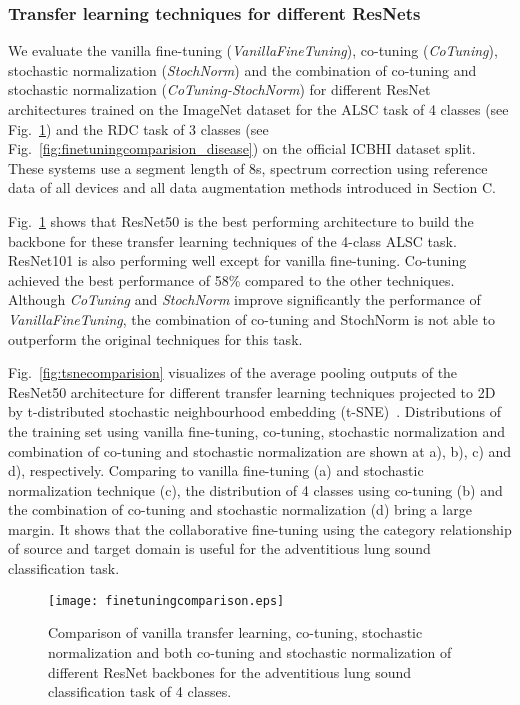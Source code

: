 \documentclass[journal]{IEEEtran}
\begin{document}
\subsubsection{Transfer learning techniques for different ResNets}
We evaluate the vanilla fine-tuning (\textit{VanillaFineTuning}), co-tuning (\textit{CoTuning}), stochastic normalization (\textit{StochNorm}) and the combination of co-tuning and stochastic normalization (\textit{CoTuning-StochNorm}) for different ResNet architectures trained on the ImageNet dataset for the ALSC task of 4 classes (see Fig.~\ref{fig:finetuningcomparision}) and the RDC task of 3 classes (see Fig.~\ref{fig:finetuningcomparision_disease}) on the official ICBHI dataset split. These systems use a segment length of 8s, spectrum correction using reference data  of all devices and all data augmentation methods introduced in Section C. 

Fig.~\ref{fig:finetuningcomparision} shows that ResNet50 is the best performing architecture to build the backbone for these transfer learning techniques of the 4-class ALSC task. ResNet101 is also performing well except for vanilla fine-tuning. Co-tuning achieved the best performance of 58\% compared to the other techniques. Although \textit{CoTuning} and \textit{StochNorm} improve significantly the performance of \textit{VanillaFineTuning}, the combination of co-tuning and StochNorm is not able to outperform the original techniques for this task.  

Fig.~\ref{fig:tsnecomparision} visualizes of the average pooling outputs of the ResNet50 architecture for different transfer learning techniques projected to 2D by t-distributed stochastic neighbourhood embedding (t-SNE)~\cite{JMLR:v9:vandermaaten08a}. Distributions of the training set using vanilla fine-tuning, co-tuning, stochastic normalization and combination of co-tuning and stochastic normalization are shown at a), b), c) and d), respectively.  Comparing to vanilla fine-tuning (a) and stochastic normalization technique (c), the distribution of 4 classes using co-tuning (b) and the combination of co-tuning and stochastic normalization (d) bring a large margin. It shows that the collaborative fine-tuning using the category relationship of source and target domain is useful for the adventitious lung sound classification task.
\begin{figure}[t]
	\centering
    \texttt{[image: finetuningcomparison.eps]}
	\caption{Comparison of vanilla transfer learning, co-tuning, stochastic normalization and both co-tuning and stochastic normalization of different ResNet backbones for the adventitious lung sound classification task of 4 classes.}
	\label{fig:finetuningcomparision}
\end{figure}
\end{document}
